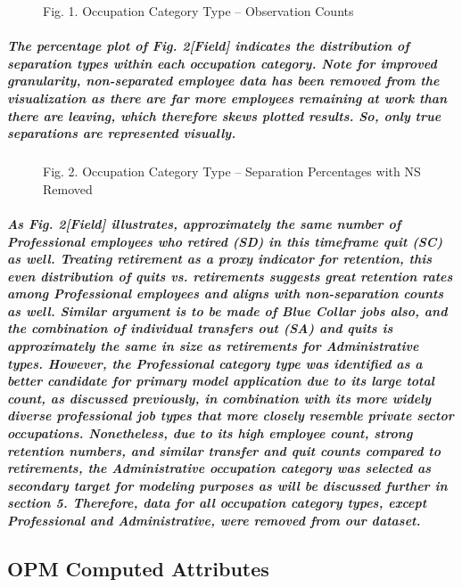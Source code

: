 \documentclass{article}
\begin{document}
 
\begin{figure}
\caption{Fig. 1. Occupation Category Type – Observation Counts}
\end{figure}
 
\subparagraph{The percentage plot of Fig. 2[Field] indicates the distribution of separation types within each occupation category. Note for improved granularity, non-separated employee data has been removed from the visualization as there are far more employees remaining at work than there are leaving, which therefore skews plotted results. So, only true separations are represented visually.}

\begin{figure}
\caption{Fig. 2. Occupation Category Type – Separation Percentages with NS Removed}
\end{figure}
 
\subparagraph{As Fig. 2[Field] illustrates, approximately the same number of Professional employees who retired (SD) in this timeframe quit (SC) as well. Treating retirement as a proxy indicator for retention, this even distribution of quits vs. retirements suggests great retention rates among Professional employees and aligns with non-separation counts as well. Similar argument is to be made of Blue Collar jobs also, and the combination of individual transfers out (SA) and quits is approximately the same in size as retirements for Administrative types. However, the Professional category type was identified as a better candidate for primary model application due to its large total count, as discussed previously, in combination with its more widely diverse professional job types that more closely resemble private sector occupations. Nonetheless, due to its high employee count, strong retention numbers, and similar transfer and quit counts compared to retirements, the Administrative occupation category was selected as secondary target for modeling purposes as will be discussed further in section 5. Therefore, data for all occupation category types, except Professional and Administrative, were removed from our dataset.} 
 
 
\subsection{OPM Computed Attributes}
\end{document}
